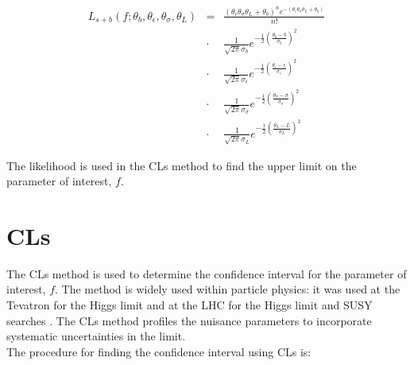 \begin{eqnarray}
L_{s+b}(f; \theta_{b}, \theta_{\epsilon}, \theta_{\sigma}, \theta_{L}) &=&
\frac{(\theta_{\epsilon}\theta_{\sigma}\theta_{L}+\theta_{b})^{n}e^{-(\theta_{\epsilon}\theta_{\sigma}\theta_{L}+\theta_{b})}}{n!}
\nonumber \\
&\cdot&
\frac{1}{\sqrt{2\pi}\sigma_{b}}e^{-\frac{1}{2}\left(\frac{\theta_{b}-b}{\sigma_{b}}\right)^{2}}
\nonumber \\
&\cdot&
\frac{1}{\sqrt{2\pi}\sigma_{\epsilon}}e^{-\frac{1}{2}\left(\frac{\theta_{\epsilon}-\epsilon}{\sigma_{\epsilon}}\right)^{2}}
\nonumber \\
&\cdot&
\frac{1}{\sqrt{2\pi}\sigma_{\sigma}}e^{-\frac{1}{2}\left(\frac{\theta_{\sigma}-\sigma}{\sigma_{\sigma}}\right)^{2}}
\nonumber \\
&\cdot& 
\frac{1}{\sqrt{2\pi}\sigma_{L}}e^{-\frac{1}{2}\left(\frac{\theta_{L}-L}{\sigma_{L}}\right)^{2}} 
\label{eq:Full_Likelihood}
\end{eqnarray}

The likelihood is used in the CLs method to find the upper limit on the
parameter of interest, $f$.

\section{CLs}

The CLs method is used to determine the confidence interval for the parameter of
interest, $f$. The method is widely used within particle physics: it was used at
the Tevatron for the Higgs limit \cite{cls_tevatron} and at the LHC for the 
Higgs limit \cite{cls_lhc} and SUSY searches \cite{ra1}. The CLs method profiles
the nuisance parameters to incorporate systematic uncertainties in the limit. \\

The procedure for finding the confidence interval using CLs is:

